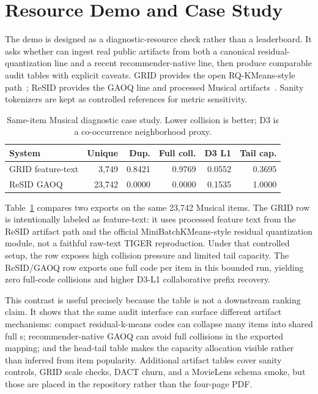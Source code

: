 \section{Resource Demo and Case Study}

The demo is designed as a diagnostic-resource check rather than a leaderboard.
It asks whether \tool can ingest real public \sid artifacts from both a
canonical residual-quantization line and a recent recommender-native line, then
produce comparable audit tables with explicit caveats. GRID provides the
open RQ-KMeans-style path~\cite{ju2025grid}; ReSID provides the GAOQ line and
processed Musical artifacts~\cite{liang2026resid}. Sanity tokenizers are kept
as controlled references for metric sensitivity.

\begin{table}[t]
\caption{Same-item Musical diagnostic case study. Lower collision is better;
D3 is a co-occurrence neighborhood proxy.}
\label{tab:musical-diagnostic}
\small
\setlength{\tabcolsep}{3.5pt}
\begin{tabular}{@{}lrrrrr@{}}
\toprule
System & Unique & Dup. & Full coll. & D3 L1 & Tail cap. \\
\midrule
GRID feature-text & 3,749 & 0.8421 & 0.9769 & 0.0552 & 0.3695 \\
ReSID GAOQ & 23,742 & 0.0000 & 0.0000 & 0.1535 & 1.0000 \\
\bottomrule
\end{tabular}
\end{table}

Table~\ref{tab:musical-diagnostic} compares two exports on the same 23,742
Musical items. The GRID row is intentionally labeled as feature-text: it uses
processed feature text from the ReSID artifact path and the official
MiniBatchKMeans-style residual quantization module, not a faithful raw-text
TIGER reproduction. Under that controlled setup, the row exposes high collision
pressure and limited tail capacity. The ReSID/GAOQ row exports one full code
per item in this bounded run, yielding zero full-code collisions and higher
D3-L1 collaborative prefix recovery.

This contrast is useful precisely because the table is not a downstream
ranking claim. It shows that the same audit interface can surface different
artifact mechanisms: compact residual-k-means codes can collapse many items
into shared full \sid{}s; recommender-native GAOQ can avoid full collisions in
the exported mapping; and the head-tail table makes the capacity allocation
visible rather than inferred from item popularity. Additional artifact tables
cover sanity controls, GRID scale checks, DACT churn, and a MovieLens schema
smoke, but those are placed in the repository rather than the four-page PDF.

